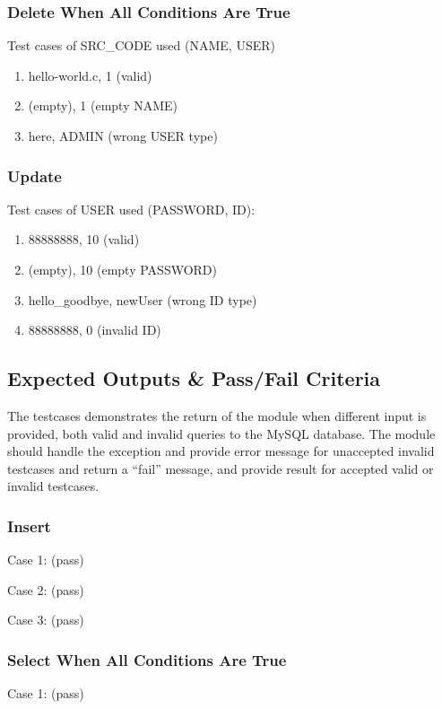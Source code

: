 \subsubsection{Delete When All Conditions Are True}
Test cases of SRC\_CODE used (NAME, USER)
\begin{enumerate}
  \item hello-world.c, 1 (valid)
  \item (empty), 1 (empty NAME)
  \item here, ADMIN (wrong USER type)
\end{enumerate}

\subsubsection{Update}
Test cases of USER used (PASSWORD, ID):
\begin{enumerate}
  \item 88888888, 10 (valid)
  \item (empty), 10 (empty PASSWORD)
  \item hello\_goodbye, newUser (wrong ID type)
  \item 88888888, 0 (invalid ID)
\end{enumerate}

\subsection{Expected Outputs \& Pass/Fail Criteria}
The testcases demonstrates the return of the module when different input is provided, both valid and invalid queries to the MySQL database. The module should handle the exception and provide error message for unaccepted invalid testcases and return a ``fail'' message, and provide result for accepted valid or invalid testcases.
\subsubsection{Insert}
Case 1: (pass)


Case 2: (pass)


Case 3: (pass)


\subsubsection{Select When All Conditions Are True}
Case 1: (pass)


